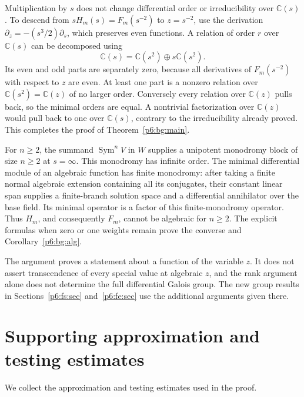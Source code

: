 \documentclass[11pt,a4paper]{article}
\theoremstyle{definition}
\theoremstyle{remark}
\numberwithin{equation}{section}
\begin{document}
Multiplication by $s$ does not change differential order or
irreducibility over $\mathbb C(s)$.  To descend from
$sH_m(s)=F_m(s^{-2})$ to $z=s^{-2}$, use the derivation
$\partial_z=-(s^3/2)\partial_s$, which preserves even functions.
A relation of order $r$ over $\mathbb C(s)$ can be decomposed using
\[
             \mathbb C(s)=\mathbb C(s^2)\oplus s\mathbb C(s^2).
\]
Its even and odd parts are separately zero, because all derivatives
of $F_m(s^{-2})$ with respect to $z$ are even.  At least one part
is a nonzero relation over $\mathbb C(s^2)=\mathbb C(z)$ of no
larger order.  Conversely every relation over $\mathbb C(z)$
pulls back, so the minimal orders are equal.  A nontrivial
factorization over $\mathbb C(z)$ would pull back to one over
$\mathbb C(s)$, contrary to the irreducibility already proved.
This completes the proof of Theorem~\ref{p6:bg:main}.

For $n\ge2$, the summand $\operatorname{Sym}^nV$ in $W$ supplies
a unipotent monodromy block of size $n\ge2$ at $s=\infty$.
This monodromy has infinite order.  The minimal differential
module of an algebraic function has finite monodromy: after taking
a finite normal algebraic extension containing all its conjugates,
their constant linear span supplies a finite-branch solution space
and a differential annihilator over the base field.  Its minimal
operator is a factor of this finite-monodromy operator.
Thus $H_m$, and consequently $F_m$, cannot be algebraic for
$n\ge2$.  The explicit formulas when zero or one weights remain
prove the converse and Corollary~\ref{p6:bg:alg}.

The argument proves a statement about a function of the variable
$z$.  It does not assert transcendence of every special value at
algebraic $z$, and the rank argument alone does not determine the full differential
Galois group. The new group results in Sections~\ref{p6:fs:sec} and~\ref{p6:fe:sec}
use the additional arguments given there.


\clearpage

\section{Supporting approximation and testing estimates}
\label{p6:gf:supporting}

We collect the approximation and testing estimates used in the proof.
\end{document}
